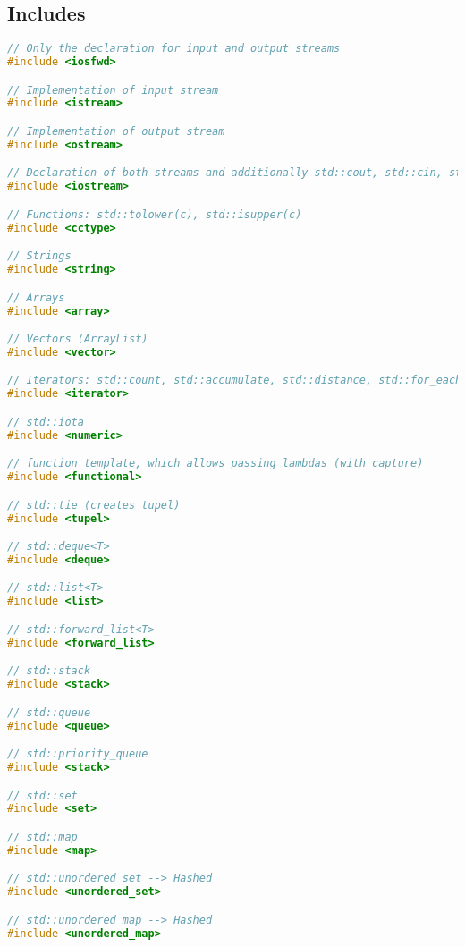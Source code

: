 
\subsection{Includes}
\begin{lstlisting}[style=frame, style= linenumbers, language=C]
// Only the declaration for input and output streams
#include <iosfwd>

// Implementation of input stream
#include <istream>

// Implementation of output stream
#include <ostream>

// Declaration of both streams and additionally std::cout, std::cin, std::cerr
#include <iostream>

// Functions: std::tolower(c), std::isupper(c)
#include <cctype>

// Strings
#include <string>

// Arrays
#include <array>

// Vectors (ArrayList)
#include <vector>

// Iterators: std::count, std::accumulate, std::distance, std::for_each
#include <iterator>

// std::iota
#include <numeric>

// function template, which allows passing lambdas (with capture)
#include <functional>

// std::tie (creates tupel)
#include <tupel>

// std::deque<T>
#include <deque>

// std::list<T>
#include <list>

// std::forward_list<T>
#include <forward_list>

// std::stack
#include <stack>

// std::queue
#include <queue>

// std::priority_queue
#include <stack>

// std::set
#include <set>

// std::map
#include <map>

// std::unordered_set --> Hashed
#include <unordered_set>

// std::unordered_map --> Hashed
#include <unordered_map>
\end{lstlisting}